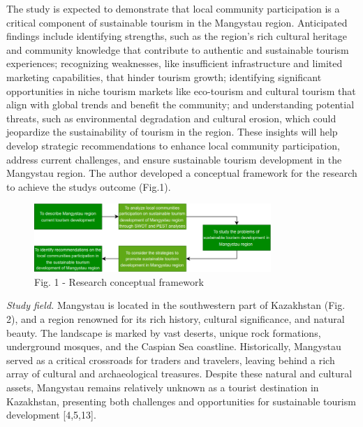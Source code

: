 \begin{multicols}{2}
The study is expected to demonstrate that local community participation
is a critical component of sustainable tourism in the Mangystau region.
Anticipated findings include identifying strengths, such as the region's
rich cultural heritage and community knowledge that contribute to
authentic and sustainable tourism experiences; recognizing weaknesses,
like insufficient infrastructure and limited marketing capabilities,
that hinder tourism growth; identifying significant opportunities in
niche tourism markets like eco-tourism and cultural tourism that align
with global trends and benefit the community; and understanding
potential threats, such as environmental degradation and cultural
erosion, which could jeopardize the sustainability of tourism in the
region. These insights will help develop strategic recommendations to
enhance local community participation, address current challenges, and
ensure sustainable tourism development in the Mangystau region. The
author developed a conceptual framework for the research to achieve the
study\textquotesingle s outcome (Fig.1).
\end{multicols}

\begin{figure}[H]
	\centering
	\includegraphics[width=0.8\textwidth]{assets/337}
	\caption*{Fig. 1 - Research conceptual framework}
\end{figure}

\begin{multicols}{2}
\emph{Study field.} Mangystau is located in the southwestern part of
Kazakhstan (Fig. 2), and a region renowned for its rich history,
cultural significance, and natural beauty. The landscape is marked by
vast deserts, unique rock formations, underground mosques, and the
Caspian Sea coastline. Historically, Mangystau served as a critical
crossroads for traders and travelers, leaving behind a rich array of
cultural and archaeological treasures. Despite these natural and
cultural assets, Mangystau remains relatively unknown as a tourist
destination in Kazakhstan, presenting both challenges and opportunities
for sustainable tourism development {[}4,5,13{]}.
\end{multicols}

